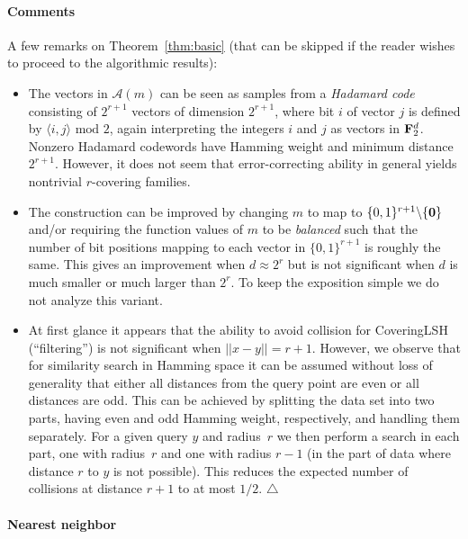 \documentclass[prodmode,acmtalg]{acmsmall}
\begin{document}
\paragraph{Comments} A few remarks on Theorem~\ref{thm:basic} (that can be skipped if the reader wishes to proceed to the algorithmic results):
\begin{itemize}
\item The vectors in $\mathcal{A}(m)$ can be seen as samples from a \emph{Hadamard code} consisting of $2^{r+1}$ vectors of dimension $2^{r+1}$, where bit $i$ of vector $j$ is defined by $\langle i,j\rangle \text{ mod }2$, again interpreting the integers $i$ and $j$ as vectors in ${\bf F}_2^d$.
Nonzero Hadamard codewords have Hamming weight and minimum distance $2^{r+1}$.
However, it does not seem that error-correcting ability in general yields nontrivial $r$-covering families.

\item The construction can be improved by changing $m$ to map to $\{0,1\}^{r+1}\backslash \{{\bf 0}\}$ and/or requiring the function values of $m$ to be \emph{balanced} such that the number of bit positions mapping to each vector in $\{0,1\}^{r+1}$ is roughly the same.
This gives an improvement when $d\approx 2^r$ but is not significant when $d$ is much smaller or much larger than $2^r$.
To keep the exposition simple we do not analyze this variant.
\item At first glance it appears that the ability to avoid collision for CoveringLSH (``filtering'') is not significant when $||x-y|| = r+1$.
However, we observe that for similarity search in Hamming space it can be assumed without loss of generality that either all distances from the query point are even or all distances are odd.
This can be achieved by splitting the data set into two parts, having even and odd Hamming weight, respectively, and handling them separately.
For a given query $y$ and radius~$r$ we then perform a search in each part, one with radius~$r$ and one with radius $r-1$ (in the part of data where distance $r$ to $y$ is not possible).
This reduces the expected number of collisions at distance $r+1$ to at most $1/2$. $\triangle$
\end{itemize}


\paragraph{Nearest neighbor} 
\end{document}
